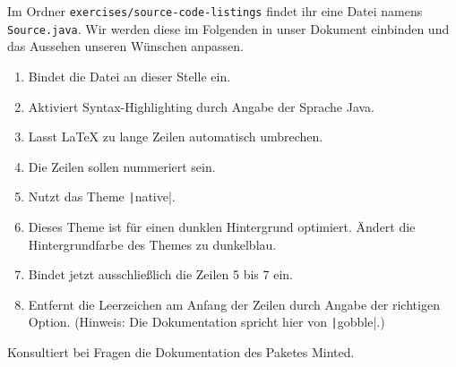 Im Ordner \texttt{exercises/source-code-listings} findet ihr eine Datei namens \texttt{Source.java}.
Wir werden diese im Folgenden in unser Dokument einbinden und das Aussehen unseren Wünschen anpassen.

\begin{enumerate}
  \item Bindet die Datei an dieser Stelle ein.
  \item Aktiviert Syntax-Highlighting durch Angabe der Sprache Java.
  \item Lasst LaTeX zu lange Zeilen automatisch umbrechen.
  \item Die Zeilen sollen nummeriert sein.
  \item Nutzt das Theme \texttt|native|.
  \item Dieses Theme ist für einen dunklen Hintergrund optimiert. Ändert die Hintergrundfarbe des Themes zu dunkelblau.
  \item Bindet jetzt ausschließlich die Zeilen 5 bis 7 ein.
  \item Entfernt die Leerzeichen am Anfang der Zeilen durch Angabe der richtigen Option. (Hinweis: Die Dokumentation spricht hier von \texttt|gobble|.)
\end{enumerate}

Konsultiert bei Fragen die Dokumentation des Paketes Minted.

